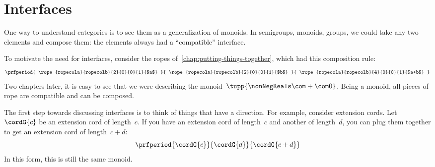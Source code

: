 
\section{Interfaces}\label{sec:interfaces}

One way to understand categories is to see them as a generalization of monoids.
In semigroups, monoids, groups, we could take any two elements and compose them: the elements always had a ``compatible'' interface.

To motivate the need for interfaces, consider the ropes of~\cref{chap:putting-things-together}, which had this composition rule:
%
\begin{equation*}
	\prfperiod{
		\rope{ropecola}{ropecolb}{2}{0}{0}{1}{$a$}
	}{
		\rope{ropecola}{ropecolb}{2}{0}{0}{1}{$b$}
	}{
		\rope{ropecola}{ropecolb}{4}{0}{0}{1}{$a+b$}
	}
\end{equation*}
%
Two chapters later, it is easy to see that we were describing the monoid~$\tupp{\nonNegReals \com + \com 0}$.
Being a monoid, all pieces of rope are compatible and can be composed.

The first step towards discussing interfaces is to think of things that have a direction.
For example, consider extension cords.
Let~$\cordG{c}$ be an extension cord of length~$c$.
If you have an extension cord of length~$c$ and another of length~$d$, you can plug them together to get an extension cord of length~$c+d$:
%
\begin{equation}
	\label{eq:cords}
	\prfperiod{
		\cordG{c}
	}{
		\cordG{d}
	}{
		\cordG{c+d}
	}
\end{equation}
%
In this form, this is still the same monoid.


